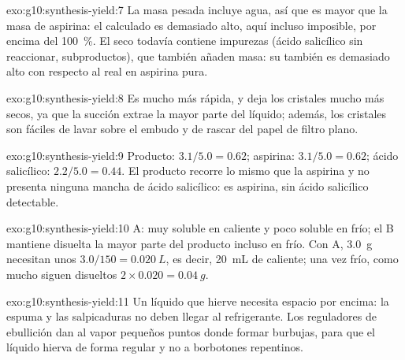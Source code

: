 \begin{solution}{exo:g10:synthesis-yield:7}
La masa pesada incluye agua, así que es mayor que la masa de aspirina:
el  calculado es demasiado alto, aquí incluso imposible, por
encima del \qty{100}{\percent}. El  seco todavía contiene
impurezas (ácido salicílico sin reaccionar, subproductos), que también
añaden masa: su  también es demasiado alto con respecto al
 real en aspirina pura.
\end{solution}

\begin{solution}{exo:g10:synthesis-yield:8}
Es mucho más rápida, y deja los cristales mucho más secos, ya que la
succión extrae la mayor parte del líquido; además, los cristales son
fáciles de lavar sobre el embudo y de rascar del papel de filtro plano.
\end{solution}

\begin{solution}{exo:g10:synthesis-yield:9}
Producto: $3.1/5.0 = 0.62$; aspirina: $3.1/5.0 = 0.62$; ácido
salicílico: $2.2/5.0 = 0.44$. El producto recorre lo mismo que la
aspirina y no presenta ninguna mancha de ácido salicílico: es aspirina,
sin ácido salicílico detectable.
\end{solution}

\begin{solution}{exo:g10:synthesis-yield:10}
 A: muy soluble en caliente y poco soluble en frío; el
 B mantiene disuelta la mayor parte del producto incluso en
frío. Con A, \qty{3.0}{g} necesitan unos
$3.0 / 150 = \qty{0.020}{L}$, es decir, \qty{20}{mL} de 
caliente; una vez frío, como mucho siguen disueltos
$2 \times 0.020 = \qty{0.04}{g}$.
\end{solution}

\begin{solution}{exo:g10:synthesis-yield:11}
Un líquido que hierve necesita espacio por encima: la espuma y las
salpicaduras no deben llegar al refrigerante. Los reguladores de
ebullición dan al vapor pequeños puntos donde formar burbujas, para que
el líquido hierva de forma regular y no a borbotones repentinos.
\end{solution}

